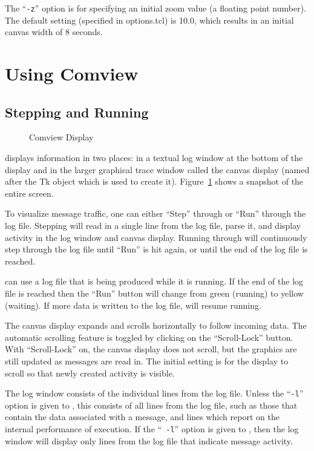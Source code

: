 The ``{\tt -z}'' option is for specifying an initial zoom value (a
floating point number). The default setting (specified in
options.tcl) is 10.0, which results in an initial canvas width of 8 seconds.

\section{Using Comview}

\subsection{Stepping and Running}

\begin{figure}[htp]
\centerline{\epsfysize=6in }
\caption{Comview Display}
\label{fig:comview}
\end{figure}

\comview{} displays information in two
places: in a textual log window at the bottom of the display and in the larger
graphical trace window called the canvas display (named after the Tk
object which is used to create it). Figure~\ref{fig:comview} shows a
snapshot of the entire \comview{} screen.

To visualize message traffic, one can either ``Step'' through
or ``Run'' through the log file. Stepping will read in a single line
from the log file, parse it, and display activity in the log window and canvas
display.  Running through will continuously step through the log file
until ``Run'' is hit again, or until the end of the log file is reached.

\comview{} can use a log file that is being produced while it is
running. If the end of the log file is reached then the ``Run'' button
will change from green (running) to yellow (waiting). If more data is
written to the log file, \comview{} will resume running.

The canvas display expands and scrolls horizontally to follow incoming data.
The automatic scrolling feature is toggled by clicking on the ``Scroll-Lock''
button.  With ``Scroll-Lock'' on, the canvas display does not scroll, but the
graphics are still updated as messages are read in.  The initial setting is for
the display to scroll so that newly created activity is visible.

The log window consists of the individual lines from the log
file. Unless the ``{\tt -l}'' option is given to \comview{}, this
consists of all lines from the log file, such as those that
contain the data associated with a message, and lines which
report on the internal performance of \system{} execution. If the ``{\tt
-l}'' option is given to \comview{}, then the log window will display
only lines from the log file that indicate message activity.

